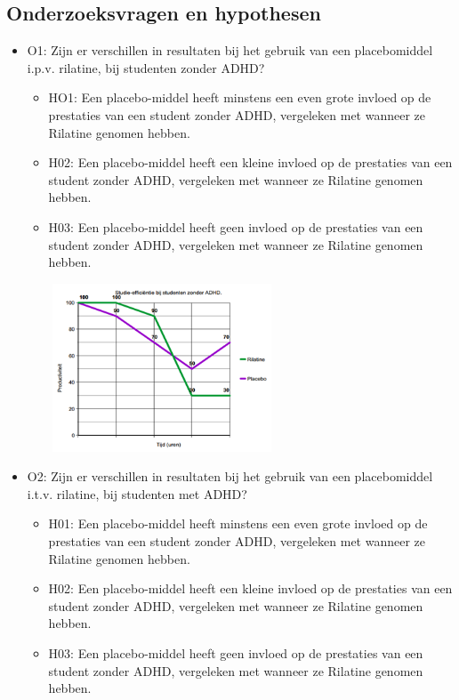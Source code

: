 \documentclass{article}
\begin{document}
\subsection{Onderzoeksvragen en hypothesen}
\begin{itemize}
	\item O1: Zijn er verschillen in resultaten bij het gebruik van een placebomiddel i.p.v. rilatine, bij studenten zonder ADHD?
	\begin{itemize}
		\item HO1: Een placebo-middel heeft minstens een even grote invloed op de prestaties van een student zonder ADHD, vergeleken met wanneer ze Rilatine genomen hebben.
		\item H02: Een placebo-middel heeft een kleine invloed op de prestaties van een student zonder ADHD, vergeleken met wanneer ze Rilatine genomen hebben.
		\item H03: Een placebo-middel heeft geen invloed op de prestaties van een student zonder ADHD, vergeleken met wanneer ze Rilatine genomen hebben.
	\end{itemize}
\begin{center}
	\includegraphics[width=8cm, height=5cm]{O1}
\end{center}
\newpage
	\item O2: Zijn er verschillen in resultaten bij het gebruik van een placebomiddel i.t.v. rilatine, bij studenten met ADHD?
	\begin{itemize}
		\item H01: Een placebo-middel heeft minstens een even grote invloed op de prestaties van een student zonder ADHD, vergeleken met wanneer ze Rilatine genomen hebben.
		\item H02: Een placebo-middel heeft een kleine invloed op de prestaties van een student zonder ADHD, vergeleken met wanneer ze Rilatine genomen hebben.
		\item H03: Een placebo-middel heeft geen invloed op de prestaties van een student zonder ADHD, vergeleken met wanneer ze Rilatine genomen hebben.
	\end{itemize}


\end{itemize}
\end{document}
